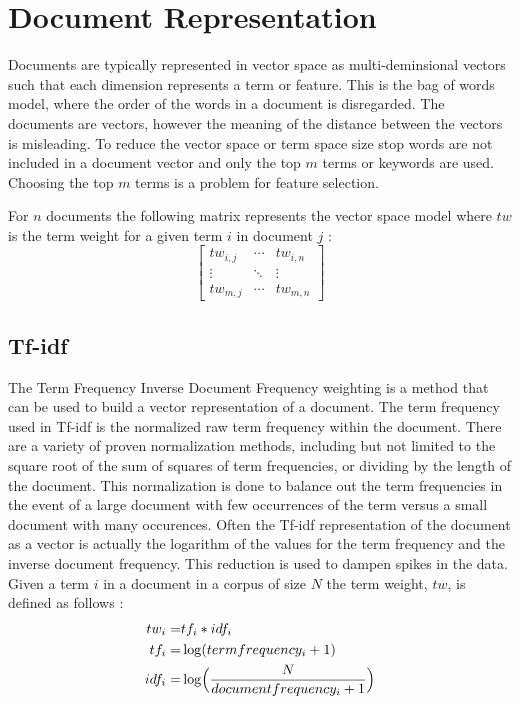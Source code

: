 \documentclass[11pt,twocolumn]{article}
\begin{document}
\section{Document Representation}
Documents are typically represented in vector space as multi-deminsional vectors such that each dimension represents a term or feature.  This is the bag of words model, where the order of the words in a document is disregarded.  The documents are vectors, however the meaning of the distance between the vectors is misleading.  To reduce the vector space or term space size stop words are not included in a document vector and only the top $m$ terms or keywords are used.  Choosing the top $m$ terms is a problem for feature selection.  

For $n$ documents the following matrix represents the vector space model where $tw$ is the term weight for a given term $i$ in document $j$ \cite{Mann2008}:
\begin{equation*}
\begin{bmatrix} tw_{i,j} & \cdots & tw_{i,n} \\ \vdots & \ddots & \vdots \\ tw_{m,j} & \cdots & tw_{m,n} \end{bmatrix}
\end{equation*}

\subsection{Tf-idf}
The Term Frequency Inverse Document Frequency weighting is a method that can be used to build a vector representation of a document.  The term frequency used in Tf-idf is the normalized raw term frequency within the document.  There are a variety of proven normalization methods, including but not limited to the square root of the sum of squares of term frequencies, or dividing by the length of the document.  This normalization is done to balance out the term frequencies in the event of a large document with few occurrences of the term versus a small document with many occurences.  Often the Tf-idf representation of the document as a vector is actually the logarithm of the values for the term frequency and the inverse document frequency.  This reduction is used to dampen spikes in the data.  Given a term $i$ in a document in a corpus of size $N$ the term weight, $tw$, is defined as follows \cite{Mann2008}:
\begin{eqnarray*}
tw_i = & tf_i \ast idf_i\\
tf_i = & \log(termfrequency_i + 1)\\
idf_i = & \log\Bigl(\frac{N}{documentfrequency_i + 1}\Bigr)
\end{eqnarray*}
\end{document}
